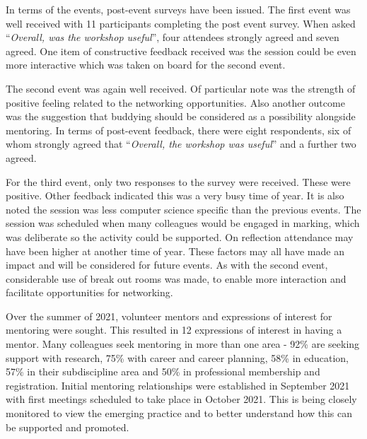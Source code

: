 \documentclass[sigconf]{acmart}
\begin{document}
In terms of the events, post-event surveys have been issued. The first
event was well received with 11 participants completing the post event
survey. When asked ``{\emph{Overall, was the workshop useful}}'', four
attendees strongly agreed and seven agreed. One item of constructive
feedback received was the session could be even more interactive which
was taken on board for the second event.

The second event was again well received. Of particular note was the
strength of positive feeling related to the networking
opportunities. Also another outcome was the suggestion that buddying
should be considered as a possibility alongside mentoring. In terms of
post-event feedback, there were eight respondents, six of whom
strongly agreed that ``{\emph{Overall, the workshop was useful}}'' and
a further two agreed.

For the third event, only two responses to the survey were
received. These were positive. Other feedback indicated this was a
very busy time of year. It is also noted the session was less computer
science specific than the previous events. The session was scheduled
when many colleagues would be engaged in marking, which was deliberate
so the activity could be supported. On reflection attendance may have
been higher at another time of year. These factors may all have made
an impact and will be considered for future events. As with the second
event, considerable use of break out rooms was made, to enable more
interaction and facilitate opportunities for networking.

\begin{comment}
TO DO - evaluation of Mentoring - PH what is needed here? Is sufficient to indicate the first pilot of 10 Mentees has been established? Or do we need feedback from the participants?
\end{comment}

Over the summer of 2021, volunteer mentors and expressions of interest for mentoring were sought. This resulted in 12 expressions of interest in having a mentor. Many colleagues seek mentoring in more than one area - 92\% are seeking support with research, 75\% with career and career planning, 58\% in education, 57\% in their subdiscipline area and 50\% in professional membership and registration. Initial mentoring relationships were established in September 2021 with first meetings scheduled to take place in October 2021. This is being closely monitored to view the emerging practice and to better understand how this can be supported and promoted.
\end{document}
